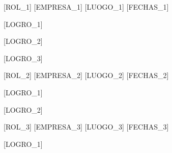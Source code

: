 
\begin{cventries}

  \cventry
    {[ROL\_1]}
    {[EMPRESA\_1]}
    {[LUOGO\_1]}
    {[FECHAS\_1]}
    {
      \begin{cvitems}
        \item {[LOGRO\_1]}
        \item {[LOGRO\_2]}
        \item {[LOGRO\_3]}
      \end{cvitems}
    }

  \cventry
    {[ROL\_2]}
    {[EMPRESA\_2]}
    {[LUOGO\_2]}
    {[FECHAS\_2]}
    {
      \begin{cvitems}
        \item {[LOGRO\_1]}
        \item {[LOGRO\_2]}
      \end{cvitems}
    }

  \cventry
    {[ROL\_3]}
    {[EMPRESA\_3]}
    {[LUOGO\_3]}
    {[FECHAS\_3]}
    {
      \begin{cvitems}
        \item {[LOGRO\_1]}
      \end{cvitems}
    }

\end{cventries}

\begin{cvparagraph}
\end{cvparagraph}
